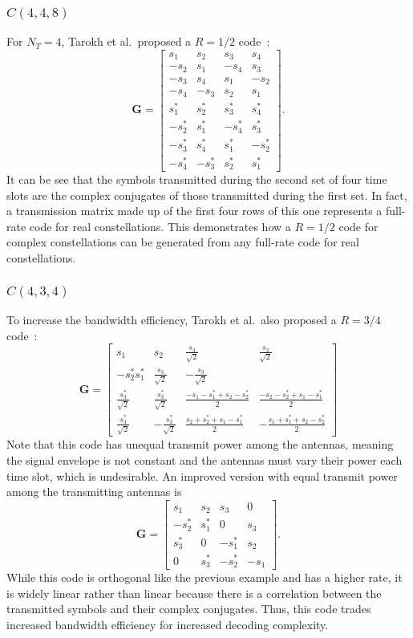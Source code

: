 \subsubsection{$C(4,4,8)$}
For $N_T=4$, Tarokh et al.\ proposed a $R=1/2$ code~\cite{tarokh99}:
\[ \bm{G} = \begin{bmatrix}
  s_1 & s_2 & s_3 & s_4 \\
  -s_2 & s_1 & -s_4 & s_3 \\
  -s_3 & s_4 & s_1 & -s_2 \\
  -s_4 & -s_3 & s_2 & s_1 \\
  s_1^\ast & s_2^\ast & s_3^\ast & s_4^\ast \\
  -s_2^\ast & s_1^\ast & -s_4^\ast & s_3^\ast \\
  -s_3^\ast & s_4^\ast & s_1^\ast & -s_2^\ast \\
  -s_4^\ast & -s_3^\ast & s_2^\ast & s_1^\ast
\end{bmatrix}. \]
It can be see that the symbols transmitted during the second set of four time slots are the complex conjugates of those transmitted during the first set. In fact, a transmission matrix made up of the first four rows of this one represents a full-rate code for real constellations. This demonstrates how a $R=1/2$ code for complex constellations can be generated from any full-rate code for real constellations.

\subsubsection{$C(4,3,4)$}
To increase the bandwidth efficiency, Tarokh et al.\ also proposed a $R=3/4$ code~\cite{tarokh99}:
\[ \bm{G} = \begin{bmatrix}
  s_1 & s_2 & \frac{s_3}{\sqrt{2}} & \frac{s_3}{\sqrt{2}} \\
  -s_2^\ast s_1^\ast & \frac{s_3}{\sqrt{2}} & -\frac{s_3}{\sqrt{2}} \\
  \frac{s_3^\ast}{\sqrt{2}} & \frac{s_3^\ast}{\sqrt{2}} & \frac{-s_1-s_1^\ast+s_2-s_2^\ast}{2} & \frac{-s_2-s_2^\ast+s_1-s_1^\ast}{2} \\
  \frac{s_3^\ast}{\sqrt{2}} & -\frac{s_3^\ast}{\sqrt{2}} & \frac{s_2+s_2^\ast+s_1-s_1^\ast}{2} & -\frac{s_1+s_1^\ast+s_2-s_2^\ast}{2}
\end{bmatrix} \]
Note that this code has unequal transmit power among the antennas, meaning the signal envelope is not constant and the antennas must vary their power each time slot, which is undesirable. An improved version with equal transmit power among the transmitting antennas is~\cite{ganesan01}
\[ \bm{G} = \begin{bmatrix}
  s_1 & s_2 & s_3 & 0 \\
  -s_2^\ast & s_1^\ast & 0 & s_3 \\
  s_3^\ast & 0 & -s_1^\ast & s_2 \\
  0 & s_3^\ast & -s_2^\ast & -s_1
\end{bmatrix}. \]
While this code is orthogonal like the previous example and has a higher rate, it is widely linear rather than linear because there is a correlation between the transmitted symbols and their complex conjugates. Thus, this code trades increased bandwidth efficiency for increased decoding complexity.

